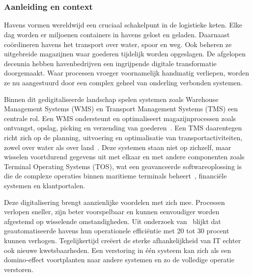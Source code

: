 
\chapter{}%
\label{ch:inleiding}

\subsection{Aanleiding en context}

Havens vormen wereldwijd een cruciaal schakelpunt in de logistieke keten. Elke dag worden er miljoenen containers in havens gelost en geladen. Daarnaast coördineren havens het transport over water, spoor en weg. Ook beheren ze uitgebreide magazijnen waar goederen tijdelijk worden opgeslagen. De afgelopen decennia hebben havenbedrijven een ingrijpende digitale transformatie doorgemaakt. Waar processen vroeger voornamelijk handmatig verliepen, worden ze nu aangestuurd door een complex geheel van onderling verbonden systemen.

Binnen dit gedigitaliseerde landschap spelen systemen zoals Warehouse Management Systems (WMS) en Transport Management Systems (TMS) een centrale rol. Een WMS ondersteunt en optimaliseert magazijnprocessen zoals ontvangst, opslag, picking en verzending van goederen~\autocite{Matthias2025}. Een TMS daarentegen richt zich op de planning, uitvoering en optimalisatie van transportactiviteiten, zowel over water als over land~\autocite{SAPn.d.}. Deze systemen staan niet op zichzelf, maar wisselen voortdurend gegevens uit met elkaar en met andere componenten zoals Terminal Operating Systems (TOS), wat een geavanceerde softwareoplossing is die de complexe operaties binnen maritieme terminals beheert~\autocite{LMA2025}, financiële systemen en klantportalen.

Deze digitalisering brengt aanzienlijke voordelen met zich mee. Processen verlopen sneller, zijn beter voorspelbaar en kunnen eenvoudiger worden afgestemd op wisselende omstandigheden. Uit onderzoek van~\autocite{Rodrigue2024} blijkt dat geautomatiseerde havens hun operationele efficiëntie met 20 tot 30 procent kunnen verhogen. Tegelijkertijd creëert de sterke afhankelijkheid van IT echter ook nieuwe kwetsbaarheden. Een verstoring in één systeem kan zich als een domino-effect voortplanten naar andere systemen en zo de volledige operatie verstoren.


